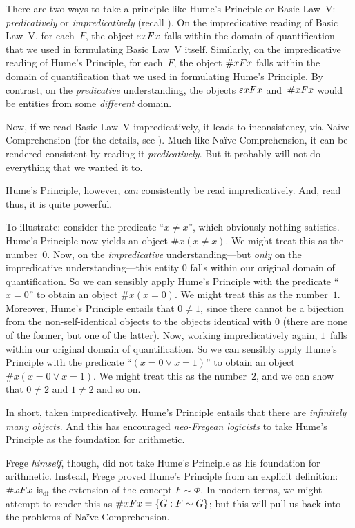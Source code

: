 \documentclass[../../../include/open-logic-section]{subfiles}
\begin{document}
There are two ways to take a principle like Hume's Principle or Basic
Law~V: \emph{predicatively} or \emph{impredicatively} (recall
). On the impredicative reading of
Basic Law~V, for each~$F$, the object $\fregeext{F}$ falls within the
domain of quantification that we used in formulating Basic Law~V
itself. Similarly, on the impredicative reading of Hume's Principle,
for each~$F$, the object $\# x Fx$ falls within the domain of
quantification that we used in formulating Hume's Principle. By
contrast, on the \emph{predicative} understanding, the objects
$\fregeext{F}$ and~$\# x Fx$ would be entities from some
\emph{different} domain. 

Now, if we read Basic Law~V impredicatively, it leads to
inconsistency, via Na\"ive Comprehension (for the details, see
). Much like Na\"ive Comprehension, it can be
rendered consistent by reading it \emph{predicatively}. But it
probably will not do everything that we wanted it to. 

Hume's Principle, however, \emph{can} consistently be read
impredicatively. And, read thus, it is quite powerful.

To illustrate: consider the predicate ``$x \neq x$'', which obviously
nothing satisfies. Hume's Principle now yields an object $\# x( x\neq
x)$. We might treat this as the number~$0$. Now, on the
\emph{impredicative} understanding---but \emph{only} on the
impredicative understanding---this entity $0$ falls within our
original domain of quantification. So we can sensibly apply Hume's
Principle with the predicate ``$x = 0$'' to obtain an object $\#x (x =
0)$. We might treat this as the number~$1$. Moreover, Hume's Principle
entails that $0 \neq 1$, since there cannot be a bijection from the
non-self-identical objects to the objects identical with $0$ (there
are none of the former, but one of the latter). Now, working
impredicatively again, $1$~falls within our original domain of
quantification. So we can sensibly apply Hume's Principle with the
predicate ``$(x = 0 \lor x = 1)$'' to obtain an object $\#x(x = 0 \lor
x = 1)$. We might treat this as the number~$2$, and we can show that
$0\neq 2$ and $1 \neq 2$ and so on. 

In short, taken impredicatively, Hume's Principle entails that there
are \emph{infinitely many objects}. And this has encouraged
\emph{neo-Fregean logicists} to take Hume's Principle as the
foundation for arithmetic. 

Frege \emph{himself}, though, did not take Hume's Principle as his
foundation for arithmetic. Instead, Frege proved Hume's Principle from
an explicit definition: $\# x Fx$ is$_\text{df}$ the extension of
the concept $F \sim \Phi$. In modern terms, we might attempt to render
this as $\# x Fx = \{ G : F \sim G \}$; but this will pull us
back into the problems of Na\"ive Comprehension.
\end{document}
